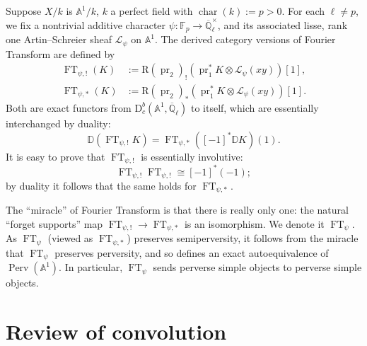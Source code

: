 Suppose \(X/k\) is \(\mathbb{A}^1/k\), \(k\) a perfect field with
\(\operatorname{char}(k):=p>0\). For each \(\ell\neq p\), we fix a nontrivial
additive character
\(\psi:\mathbb{F}_p\to\overline{\mathbb{Q}}_\ell^\times\), and its associated
lisse, rank one Artin--Schreier sheaf \(\mathcal{L}_\psi\) on
\(\mathbb{A}^1\). The derived category versions of Fourier Transform are
defined by
\[
\begin{aligned}
  \operatorname{FT}_{\psi,!}(K)
  &:=
  \mathrm{R}(\operatorname{pr}_2)_!
  (\operatorname{pr}_1^*K\otimes\mathcal{L}_\psi(xy))[1],\\
  \operatorname{FT}_{\psi,*}(K)
  &:=
  \mathrm{R}(\operatorname{pr}_2)_*
  (\operatorname{pr}_1^*K\otimes\mathcal{L}_\psi(xy))[1].
\end{aligned}
\]
Both are exact functors from
\(\mathrm{D}^b_c(\mathbb{A}^1,\overline{\mathbb{Q}}_\ell)\) to itself, which
are essentially interchanged by duality:
\[
  \mathbb{D}(\operatorname{FT}_{\psi,!}K)
  =\operatorname{FT}_{\psi,*}([-1]^*\mathbb{D}K)(1).
\]
It is easy to prove that \(\operatorname{FT}_{\psi,!}\) is essentially
involutive:
\[
  \operatorname{FT}_{\psi,!}\operatorname{FT}_{\psi,!}
  \cong[-1]^*(-1);
\]
by duality it follows that the same holds for \(\operatorname{FT}_{\psi,*}\).

The ``miracle'' of Fourier Transform is that there is really only one: the
natural ``forget supports'' map
\(\operatorname{FT}_{\psi,!}\to\operatorname{FT}_{\psi,*}\) is an isomorphism.
We denote it \(\operatorname{FT}_\psi\). As \(\operatorname{FT}_\psi\) (viewed
as \(\operatorname{FT}_{\psi,*}\)) preserves semiperversity, it follows from
the miracle that \(\operatorname{FT}_\psi\) preserves perversity, and so
defines an exact autoequivalence of
\(\operatorname{Perv}(\mathbb{A}^1)\). In particular,
\(\operatorname{FT}_\psi\) sends perverse simple objects to perverse simple
objects.

\section{Review of convolution}
\label{sec:2.5}

